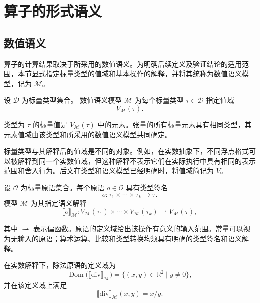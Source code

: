 \section{算子的形式语义}
\label{sec:formal-semantics-of-operators}

\subsection{数值语义}
\label{subsec:numerical-semantics}

算子的计算结果取决于所采用的数值语义。为明确后续定义及验证结论的适用范围，本节显式指定标量类型的值域和基本操作的解释，并将其统称为数值语义模型，记为 \(\mathcal M\)。

\begin{definition}[标量类型与值域]
\label{def:scalar-type-and-value-domain}
设 \(\mathcal D\) 为标量类型集合。
数值语义模型 \(\mathcal M\) 为每个标量类型 \(\tau\in\mathcal D\) 指定值域
\[
V_{\mathcal M}(\tau).
\]

类型为 \(\tau\) 的标量值是 \(V_{\mathcal M}(\tau)\) 中的元素。张量的所有标量元素具有相同类型，其元素值域由该类型和所采用的数值语义模型共同确定。

标量类型与其解释后的值域是不同的对象。例如，在实数抽象下，不同浮点格式可以被解释到同一个实数值域，但这种解释不表示它们在实际执行中具有相同的表示范围和舍入行为。后文在类型和语义模型已经明确时，将值域简记为 \(V\)。
\end{definition}

\begin{definition}[标量原语的语义]
设 \(\mathcal O\) 为标量原语集合。每个原语 \(o\in\mathcal O\) 具有类型签名
\[
o:\tau_1\times\cdots\times\tau_k\longrightarrow\tau.
\]
模型 \(\mathcal M\) 为其指定语义解释
\[
\llbracket o\rrbracket_{\mathcal M}:
V_{\mathcal M}(\tau_1)\times\cdots\times V_{\mathcal M}(\tau_k)
\rightharpoonup V_{\mathcal M}(\tau),
\]
\end{definition}

其中 \(\rightharpoonup\) 表示偏函数。原语的定义域给出该操作有意义的输入范围。常量可以视为无输入的原语；算术运算、比较和类型转换均须具有明确的类型签名和语义解释。

\begin{example}[实数解释下的除法原语语义]
在实数解释下，除法原语的定义域为
\[
\operatorname{Dom}\bigl(\llbracket\mathrm{div}\rrbracket_{\mathcal M}\bigr)
=\{(x,y)\in\mathbb R^2\mid y\ne0\},
\]
并在该定义域上满足
\[
\llbracket\mathrm{div}\rrbracket_{\mathcal M}(x,y)=x/y.
\]
\end{example}

